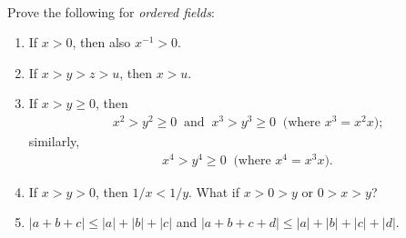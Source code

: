 \documentclass[12pt]{book}
\theoremstyle{definition}
\begin{document}
\begin{ex}[4]
\\
Prove the following for \textit{ordered fields}:
\begin{enumerate}[label=(\roman*)]
	\item If $x>0$, then also $x^{-1}>0.$
	\item If $x>y>z>u$, then $x>u$.
	\item If $x>y \geq 0$, then 
		\begin{align*}
			x^2>y^2\geq 0\;\;\text{and}\;\; x^3>y^3 \geq 0\;\; \text{(where $x^3=x^2x$);}
		\end{align*}
		similarly, 
		\begin{align*}
			x^4>y^4\geq 0\;\;\text{(where $x^4=x^3x$).} 	
		\end{align*}
	\item If $x>y>0$, then $1/x<1/y$. What if $x>0>y$ or $0>x>y$?
	\item $|a+b+c|\leq |a|+|b|+|c|$ and $|a+b+c+d|\leq |a|+|b|+|c|+|d|.$ 
\end{enumerate} 
\end{ex}
\end{document}
